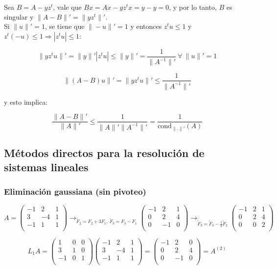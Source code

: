 Sea $B = A - yz^{t}$, vale que $Bx = Ax - yz^{t}x = y - y = 0$, y por lo tanto, $B$ es singular y $\|A - B\|' = \|yz^{t}\|'$.\\

Si $\|u\|' = 1$, se tiene que $\|-u\|' = 1$ y entonces $z^{t}u \leq 1$ y $z^{t}(-u) \leq 1 \Rightarrow |z^{t}u| \leq 1$:

$$\|yz^{t}u\|' = \|y\|'|z^{t}u| \leq \|y\|' = \frac{1}{\|A^{-1}\|'}\ \forall \ \|u\|' = 1$$

$$\|(A - B)u\|' = \|yz^{t}u\|' \leq \frac{1}{\|A^{-1}\|'}$$

y esto implica:

$$\frac{\|A - B\|'}{\|A\|'} \leq \frac{1}{\|A\|'\|A^{-1}\|'} = \frac{1}{\text{cond}_{\|.\|'}(A)}$$

\subsection{M\'etodos directos para la resoluci\'on de sistemas lineales}

\subsubsection{Eliminaci\'on gaussiana (sin pivoteo)}

$$ A = 
	\begin{pmatrix}
       -1 & 2 & 1\\
        3 & -4 & 1\\
       -1 & 1 & 1\\
	\end{pmatrix}
	\rightarrow_{
	\tilde{F}_{2} = F_{2} + 3F_{1},\ 
	\tilde{F}_{3} = F_{3} - F_{1}}
    \begin{pmatrix}
       -1 & 2 & 1\\
        0 & 2 & 4\\
        0 & -1 & 0\\
	\end{pmatrix}
	\rightarrow_{
	\tilde{\tilde{F}}_{3} = \tilde{F}_{3} - \frac{1}{2}\tilde{F}_{2}} 
    \begin{pmatrix}
       -1 & 2 & 1\\
        0 & 2 & 4\\
        0 & 0 & 2\\
	\end{pmatrix}
$$

$$ L_{1}A =
	\begin{pmatrix}
        1 & 0 & 0\\
        3 & 1 & 0\\
        -1 & 0 & 1\\
	\end{pmatrix}
	\begin{pmatrix}
       -1 & 2 & 1\\
        3 & -4 & 1\\
       -1 & 1 & 1\\
	\end{pmatrix}
	=
	\begin{pmatrix}
       -1 & 2 & 0\\
        0 & 2 & 4\\
       0 & -1 & 0\\
	\end{pmatrix}
	=
	A^{(2)}
$$

